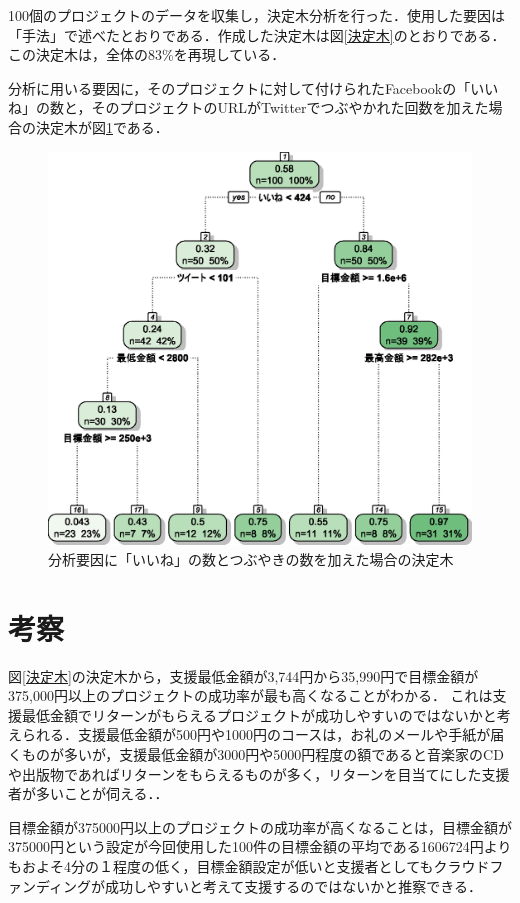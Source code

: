 \documentclass[uplatex,twocolumn]{jsarticle}
\begin{document}
100個のプロジェクトのデータを収集し，決定木分析を行った．使用した要因は「手法」で述べたとおりである．作成した決定木は図\ref{決定木}のとおりである．この決定木は，全体の83\%を再現している．

分析に用いる要因に，そのプロジェクトに対して付けられたFacebookの「いいね」の数と，そのプロジェクトのURLがTwitterでつぶやかれた回数を加えた場合の決定木が図\ref{決定木2}である．

\begin{figure}[htb]
\includegraphics[width=\columnwidth,clip]{figure2.eps}
\caption{分析要因に「いいね」の数とつぶやきの数を加えた場合の決定木}\label{決定木2}
\end{figure}

\section{考察}

図\ref{決定木}の決定木から，支援最低金額が3,744円から35,990円で目標金額が375,000円以上のプロジェクトの成功率が最も高くなることがわかる．
これは支援最低金額でリターンがもらえるプロジェクトが成功しやすいのではないかと考えられる．支援最低金額が500円や1000円のコースは，お礼のメールや手紙が届くものが多いが，支援最低金額が3000円や5000円程度の額であると音楽家のCDや出版物であればリターンをもらえるものが多く，リターンを目当てにした支援者が多いことが伺える．．

目標金額が375000円以上のプロジェクトの成功率が高くなることは，目標金額が375000円という設定が今回使用した100件の目標金額の平均である1606724円よりもおよそ4分の１程度の低く，目標金額設定が低いと支援者としてもクラウドファンディングが成功しやすいと考えて支援するのではないかと推察できる．
\end{document}
